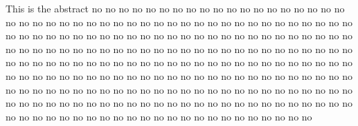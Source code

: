 
This is the abstract no no no no no no no no no no no no no no no no no no no no no no no no no no no no no no no no no no no no no no no no no no no no no no no no no no no no no no no no no no no no no no no no no no no no no no no no no no no no no no no no no no no no no no no no no no no no no no no no no no no no no no no no no no no no no no no no no no no no no no no no no no no no no no no no no no no no no no no no no no no no no no no no no no no no no no no no no no no no no no no no no no no no no no no no no no no no no no no no no no no no no no no no no no no no no no no no no no no no no no no no no no no no no no no no no no no no no no no no no no no no no no no no